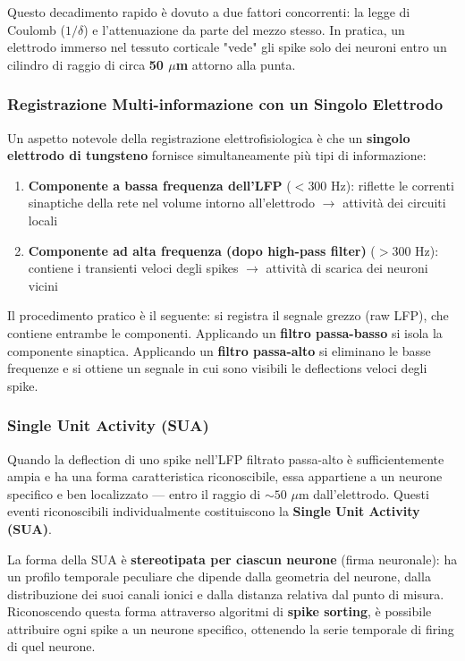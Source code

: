Questo decadimento rapido è dovuto a due fattori concorrenti: la legge di Coulomb ($1/\delta$) e l'attenuazione da parte del mezzo stesso. In pratica, un elettrodo immerso nel tessuto corticale "vede" gli spike solo dei neuroni entro un cilindro di raggio di circa \textbf{50 $\mu$m} attorno alla punta.

\subsubsection{Registrazione Multi-informazione con un Singolo Elettrodo}

Un aspetto notevole della registrazione elettrofisiologica è che un \textbf{singolo elettrodo di tungsteno} fornisce simultaneamente più tipi di informazione:

\begin{enumerate}
    \item \textbf{Componente a bassa frequenza dell'LFP} ($<300$ Hz): riflette le correnti sinaptiche della rete nel volume intorno all'elettrodo $\rightarrow$ attività dei circuiti locali
    \item \textbf{Componente ad alta frequenza (dopo high-pass filter)} ($>300$ Hz): contiene i transienti veloci degli spikes $\rightarrow$ attività di scarica dei neuroni vicini
\end{enumerate}

Il procedimento pratico è il seguente: si registra il segnale grezzo (raw LFP), che contiene entrambe le componenti. Applicando un \textbf{filtro passa-basso} si isola la componente sinaptica. Applicando un \textbf{filtro passa-alto} si eliminano le basse frequenze e si ottiene un segnale in cui sono visibili le deflections veloci degli spike.

\subsubsection{Single Unit Activity (SUA)}

Quando la deflection di uno spike nell'LFP filtrato passa-alto è sufficientemente ampia e ha una forma caratteristica riconoscibile, essa appartiene a un neurone specifico e ben localizzato — entro il raggio di $\sim 50$ $\mu$m dall'elettrodo. Questi eventi riconoscibili individualmente costituiscono la \textbf{Single Unit Activity (SUA)}.

La forma della SUA è \textbf{stereotipata per ciascun neurone} (firma neuronale): ha un profilo temporale peculiare che dipende dalla geometria del neurone, dalla distribuzione dei suoi canali ionici e dalla distanza relativa dal punto di misura. Riconoscendo questa forma attraverso algoritmi di \textbf{spike sorting}, è possibile attribuire ogni spike a un neurone specifico, ottenendo la serie temporale di firing di quel neurone.

